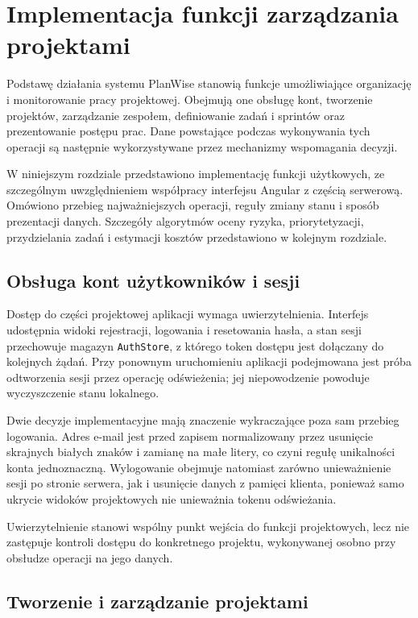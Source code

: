 \chapter{Implementacja funkcji zarządzania projektami}
\label{chap:implementacja-funkcji}

Podstawę działania systemu PlanWise stanowią funkcje umożliwiające organizację i monitorowanie pracy projektowej. Obejmują one obsługę kont, tworzenie projektów, zarządzanie zespołem, definiowanie zadań i sprintów oraz prezentowanie postępu prac. Dane powstające podczas wykonywania tych operacji są następnie wykorzystywane przez mechanizmy wspomagania decyzji.

W niniejszym rozdziale przedstawiono implementację funkcji użytkowych, ze szczególnym uwzględnieniem współpracy interfejsu Angular z częścią serwerową. Omówiono przebieg najważniejszych operacji, reguły zmiany stanu i sposób prezentacji danych. Szczegóły algorytmów oceny ryzyka, priorytetyzacji, przydzielania zadań i estymacji kosztów przedstawiono w kolejnym rozdziale.

\section{Obsługa kont użytkowników i sesji}

Dostęp do części projektowej aplikacji wymaga uwierzytelnienia. Interfejs udostępnia widoki rejestracji, logowania i resetowania hasła, a stan sesji przechowuje magazyn \texttt{AuthStore}, z którego token dostępu jest dołączany do kolejnych żądań. Przy ponownym uruchomieniu aplikacji podejmowana jest próba odtworzenia sesji przez operację odświeżenia; jej niepowodzenie powoduje wyczyszczenie stanu lokalnego.

Dwie decyzje implementacyjne mają znaczenie wykraczające poza sam przebieg logowania. Adres e-mail jest przed zapisem normalizowany przez usunięcie skrajnych białych znaków i zamianę na małe litery, co czyni regułę unikalności konta jednoznaczną. Wylogowanie obejmuje natomiast zarówno unieważnienie sesji po stronie serwera, jak i usunięcie danych z pamięci klienta, ponieważ samo ukrycie widoków projektowych nie unieważnia tokenu odświeżania.

Uwierzytelnienie stanowi wspólny punkt wejścia do funkcji projektowych, lecz nie zastępuje kontroli dostępu do konkretnego projektu, wykonywanej osobno przy obsłudze operacji na jego danych.

\section{Tworzenie i zarządzanie projektami}

